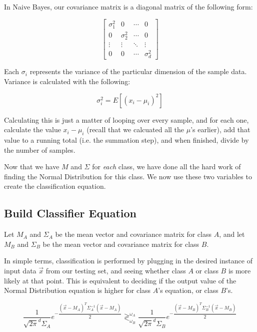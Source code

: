 \documentclass{article}
\begin{document}
In Naive Bayes, our covariance matrix is a diagonal matrix of the following form:

\begin{displaymath}
\begin{bmatrix} \sigma^2_1 & 0 & \cdots & 0 \\
				 0 & \sigma^2_2 & \cdots & 0 \\
				 \vdots & \vdots & \ddots & \vdots \\
				 0 & 0 & \cdots & \sigma^2_d
\end{bmatrix}
\end{displaymath}

Each $\sigma_i$ represents the variance of the particular dimension of the sample data.  Variance is calculated with the following:

\begin{displaymath}
 \sigma^2_i = E [{(x_i - \mu_i)}^2]
\end{displaymath}

Calculating this is just a matter of looping over every sample, and for each one, calculate the value $x_i - \mu_i$ (recall that we calcuated all the $\mu$'s earlier), add that value to a running total (i.e. the summation step), and when finished, divide by the number of samples.

Now that we have $M$ and $\Sigma$ for \emph{each} class, we have done all the hard work of finding the Normal Distribution for this class.  We now use these two variables to create the classification equation.

\subsection{Build Classifier Equation}

Let $M_A$ and $\Sigma_A$ be the mean vector and covariance matrix for class $A$, and let $M_B$ and $\Sigma_B$ be the mean vector and covariance matrix for class $B$.

In simple terms, classification is performed by plugging in the desired instance of input data $\vec{x}$ from our testing set, and seeing whether class $A$ or class $B$ is more likely at that point. This is equivalent to deciding if the output value of the Normal Distribution equation is higher for class $A$'s equation, or class $B$'s.

\begin{displaymath}
 \dfrac{1}{\sqrt{2\pi}^d \Sigma_A} e^{-\dfrac{(\vec{x}-M_A)^T \Sigma^{-1}_A (\vec{x}-M_A)}{2}}
  \gtrless^{\omega_A}_{\omega_B} 
  \dfrac{1}{\sqrt{2\pi}^d \Sigma_B} e^{-\dfrac{(\vec{x}-M_B)^T \Sigma^{-1}_B (\vec{x}-M_B)}{2}}
\end{displaymath}
\end{document}
